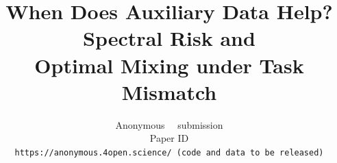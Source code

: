 \documentclass[10pt,twocolumn,letterpaper]{article}
\title{When Does Auxiliary Data Help? Spectral Risk and\\
Optimal Mixing under Task Mismatch}
\author{Anonymous \confName~\confYear~submission\\
Paper ID \paperID\\
{\tt\small https://anonymous.4open.science/ (code and data to be released)}
}
\begin{document}
\maketitle








{
    \small
    
    
}

% 
\end{document}
